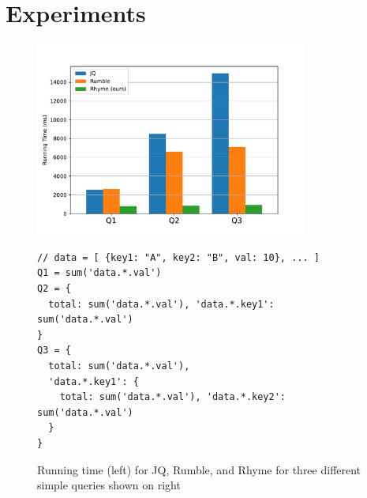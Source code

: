 \documentclass[runningheads]{llncs}
\begin{document}




\section{Experiments}\label{sec:experiments}

\begin{figure}[t]
\begin{minipage}{0.4\textwidth}
\centering
\includegraphics[width=0.8\textwidth]{images/plot.pdf}
\end{minipage}
\begin{minipage}{0.6\textwidth}
\begin{lstlisting}[style=JavaScriptTiny, columns=flexible]
// data = [ {key1: "A", key2: "B", val: 10}, ... ]
Q1 = sum('data.*.val')
Q2 = {
  total: sum('data.*.val'), 'data.*.key1': sum('data.*.val')
}
Q3 = {
  total: sum('data.*.val'),
  'data.*.key1': {
    total: sum('data.*.val'), 'data.*.key2': sum('data.*.val')
  }
}
\end{lstlisting}
\end{minipage}
\caption{Running time (left) for JQ, Rumble, and Rhyme for three different simple queries shown
on right
}\label{fig:plot}
\end{figure}
\end{document}
